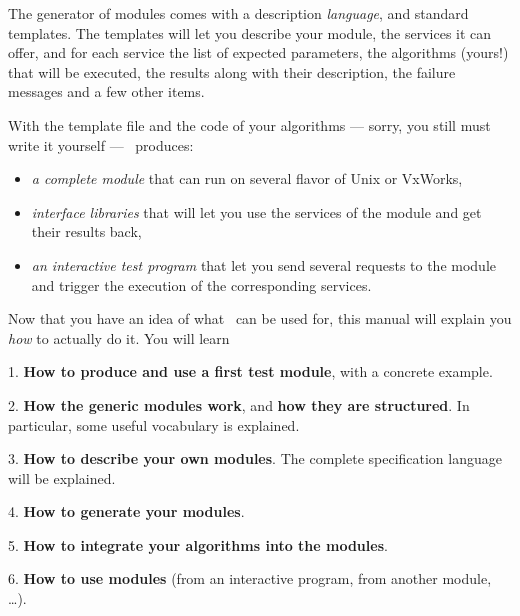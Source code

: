 \bigbreak

The generator  of modules comes  with  a description {\em language},  and
standard templates.  The templates will let you describe your module, the
services  it  can offer, and  for   each  service the  list  of  expected
parameters,  the algorithms (yours!) that will  be  executed, the results
along with their description, the failure messages and a few other items.

With the template file and the code of your algorithms --- sorry, you still
must write it yourself --- \GenoM\ produces:

\begin{itemize}
   \item {\em a complete module} that can run on several flavor of Unix
or VxWorks, 
   \item {\em interface libraries} that will let you use the services of
the module and get their results back,
   \item {\em an interactive test program} that let you send several
requests to the module and trigger the execution of the corresponding
services.
\end{itemize}

\bigbreak

Now that you  have an idea  of what \GenoM\ can  be used for, this manual
will explain you {\em how} to actually do it. You will learn

\begin{center}\begin{cartouche}\parbox{0.9\hsize}{
\parskip10pt
    1. {\bf How to produce and use a first test module}, with a concrete
example.

    2. {\bf How the generic modules work}, and {\bf how they are
structured}. In particular, some useful vocabulary is explained.

    3. {\bf How to describe your own modules}. The complete
specification language will be explained.

    4. {\bf How to generate your modules}.

    5. {\bf How to integrate your algorithms into the modules}.

    6. {\bf How to use modules} (from an interactive program, from
another module, \ldots).
}\end{cartouche}\end{center}

